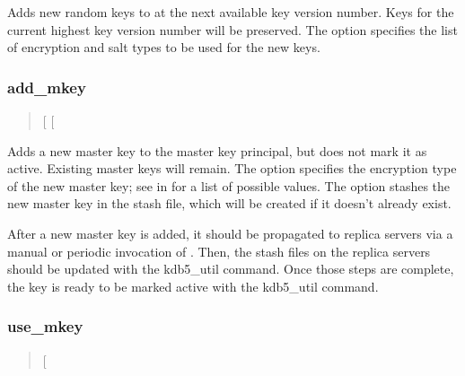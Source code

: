 \documentclass[letterpaper,10pt,english]{sphinxmanual}
\begin{document}
\sphinxAtStartPar
Adds new random keys to  at the next available key version
number.  Keys for the current highest key version number will be
preserved.  The  option specifies the list of encryption and
salt types to be used for the new keys.


\subsubsection{add\_mkey}
\label{\detokenize{admin/admin_commands/kdb5_util:add-mkey}}\begin{quote}

\sphinxAtStartPar
{} {[} \sphinxstyleemphasis{etype}{]} {[}\sphinxstylestrong{\sphinxhyphen{}s}{]}
\end{quote}

\sphinxAtStartPar
Adds a new master key to the master key principal, but does not mark
it as active.  Existing master keys will remain.  The  option
specifies the encryption type of the new master key; see
{\hyperref[\detokenize{admin/conf_files/kdc_conf:encryption-types}]{}} in {\hyperref[\detokenize{admin/conf_files/kdc_conf:kdc-conf-5}]{}} for a list of possible
values.  The  option stashes the new master key in the stash
file, which will be created if it doesn’t already exist.

\sphinxAtStartPar
After a new master key is added, it should be propagated to replica
servers via a manual or periodic invocation of {\hyperref[\detokenize{admin/admin_commands/kprop:kprop-8}]{}}.  Then,
the stash files on the replica servers should be updated with the
kdb5\_util  command.  Once those steps are complete, the key
is ready to be marked active with the kdb5\_util  command.


\subsubsection{use\_mkey}
\label{\detokenize{admin/admin_commands/kdb5_util:use-mkey}}\begin{quote}

\sphinxAtStartPar
{}  {[}\sphinxstyleemphasis{time}{]}
\end{quote}
\end{document}
